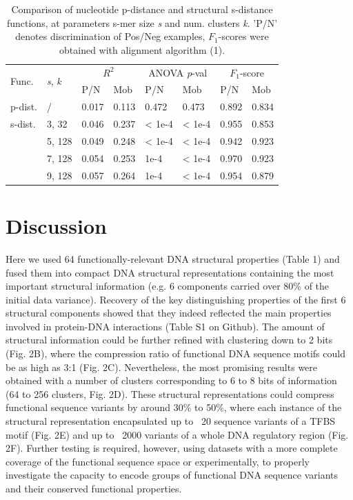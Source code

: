 \documentclass[sigconf]{acmart}
\begin{document}
\begin{table}
  \caption{Comparison of nucleotide p-distance and structural s-distance functions, at parameters s-mer size \textit{s} and num. clusters \textit{k}. 'P/N' denotes discrimination of Pos/Neg examples, $F_1$-scores were obtained with alignment algorithm (1).}
  \begin{tabular}{p{0.83cm}|p{0.7cm}|p{0.7cm}|p{0.7cm}|p{0.73cm}|p{0.73cm}|p{0.7cm}|p{0.7cm}}
  \toprule
  \multirow{2}{*}{Func.} & 
  \multirow{2}{*}{\textit{s}, \textit{k}} & 
  \multicolumn{2}{c}{\textit{$R^2$}} & 
  \multicolumn{2}{c}{ANOVA \textit{p}-val} & 
  \multicolumn{2}{c}{$F_1$-score} \\
  \cline{3-8} & & P/N & Mob & P/N & Mob& P/N & Mob \\
  \midrule
    p-dist. & / & 0.017 & 0.113 & 0.472 & 0.473 & 0.892 & 0.834\\
    s-dist. & 3, 32 & 0.046 & 0.237 & < 1e-4 & < 1e-4 & 0.955 & 0.853\\
     & 5, 128 & 0.049 & 0.248 & < 1e-4 & < 1e-4 & 0.942 & 0.923\\
     & 7, 128 & 0.054 & 0.253 & 1e-4 & < 1e-4 & 0.970 & 0.923\\
     & 9, 128 & 0.057 & 0.264 & 1e-4 & < 1e-4 & 0.954 & 0.879\\
  \bottomrule
  \end{tabular}
\end{table}

\section{Discussion}
Here we used 64 functionally-relevant DNA structural properties (Table 1) and fused them into compact DNA structural representations containing the most important structural information (e.g. 6 components carried over 80\% of the initial data variance). Recovery of the key distinguishing properties of the first 6 structural components showed that they indeed reflected the main properties involved in protein-DNA interactions (Table S1 on Github). The amount of structural information could be further refined with clustering down to 2 bits (Fig. 2B), where the compression ratio of functional DNA sequence motifs could be as high as 3:1 (Fig. 2C). Nevertheless, the most promising results were obtained with a number of clusters corresponding to 6 to 8 bits of information (64 to 256 clusters, Fig. 2D). These structural representations could compress functional sequence variants by around 30\% to 50\%, where each instance of the structural representation encapsulated up to ~20 sequence variants of a TFBS motif (Fig. 2E) and up to ~2000 variants of a whole DNA regulatory region (Fig. 2F). Further testing is required, however, using datasets with a more complete coverage of the functional sequence space or experimentally, to properly investigate the capacity to encode groups of functional DNA sequence variants and their conserved functional properties. 
\end{document}
